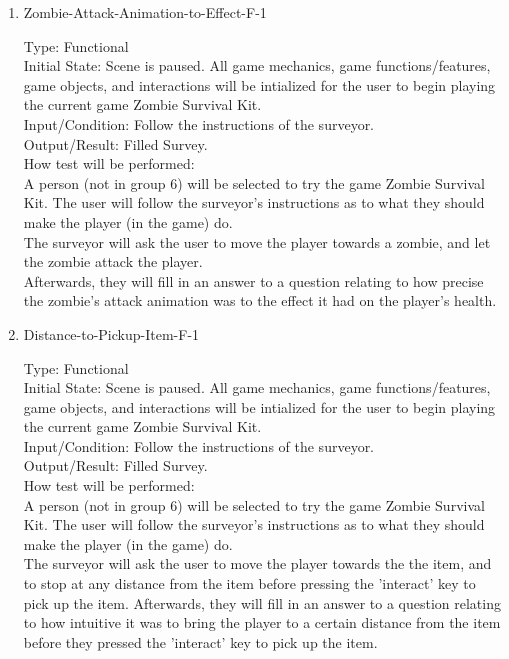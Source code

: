 \documentclass[12pt, titlepage]{article}
\begin{document}
\begin{enumerate}
	\item{Zombie-Attack-Animation-to-Effect-F-1\\}
	
	Type: Functional\\
	
	Initial State: Scene is paused. All game mechanics, game functions/features, game objects, and interactions will be intialized for the user to begin playing the current game Zombie Survival Kit.\\
	
	Input/Condition: Follow the instructions of the surveyor.\\
	
	Output/Result: Filled Survey.\\
	
	How test will be performed:\\ A person (not in group 6) will be selected to try the game Zombie Survival Kit. The user will follow the surveyor's instructions as to what they should make the player (in the game) do.\\ 
	The surveyor will ask the user to move the player towards a zombie, and let the zombie attack the player.\\
	Afterwards, they will fill in an answer to a question relating to how precise the zombie's attack animation was to the effect it had on the player's health.\\	
	
	\item{Distance-to-Pickup-Item-F-1\\}
	
	Type: Functional \\
	
	Initial State: Scene is paused. All game mechanics, game functions/features, game objects, and interactions will be intialized for the user to begin playing the current game Zombie Survival Kit. \\
	
	Input/Condition: Follow the instructions of the surveyor. \\
	
	Output/Result: Filled Survey. \\
	
	How test will be performed:\\ A person (not in group 6) will be selected to try the game Zombie Survival Kit. The user will follow the surveyor's instructions as to what they should make the player (in the game) do. \\
	The surveyor will ask the user to move the player towards the the item, and to stop at any distance from the item before pressing the 'interact' key to pick up the item.
	Afterwards, they will fill in an answer to a question relating to how intuitive it was to bring the player to a certain distance from the item before they pressed the 'interact' key to pick up the item.\\
	
\end{enumerate}
\end{document}
